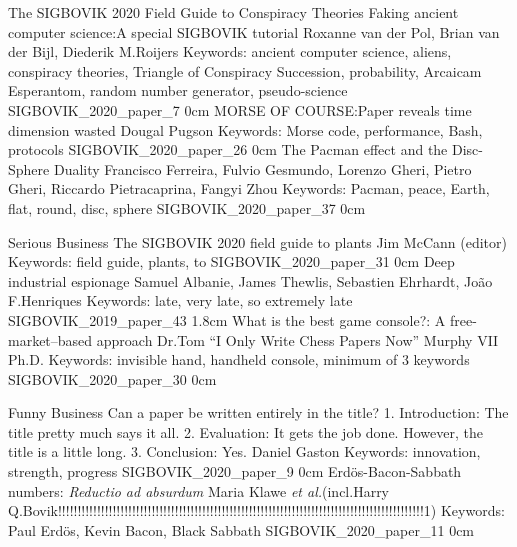 \addtrack
	{}{The SIGBOVIK 2020 Field Guide to Conspiracy Theories}
\addpaper
	{Faking ancient computer science:\@ A special SIGBOVIK tutorial}
	{Roxanne van der Pol, Brian van der Bijl, Diederik M.\@ Roijers}
	{Keywords: ancient computer science, aliens, conspiracy theories, Triangle of Conspiracy Succession, probability, Arcaicam Esperantom, random number generator, pseudo-science}
	{SIGBOVIK_2020_paper_7}
	{0cm}
	{}
\addpaper
	{MORSE OF COURSE:\@ Paper reveals time dimension wasted}
	{Dougal Pugson}
	{Keywords: Morse code, performance, Bash, protocols}
	{SIGBOVIK_2020_paper_26}
	{0cm}
	{}
\addpaper
	{The Pacman effect and the Disc-Sphere Duality}
	{Francisco Ferreira, Fulvio Gesmundo, Lorenzo Gheri, Pietro Gheri, Riccardo Pietracaprina, Fangyi Zhou}
	{Keywords: Pacman, peace, Earth, flat, round, disc, sphere}
	{SIGBOVIK_2020_paper_37}
	{0cm}
	{}

\addtrack
	{}{Serious Business}
\addpaper
	{The SIGBOVIK 2020 field guide to plants}
	{Jim McCann (editor)}
	{Keywords: field guide, plants, to}
	{SIGBOVIK_2020_paper_31}
	{0cm}
	{}
\addpaper
	{Deep industrial espionage}
	{Samuel Albanie, James Thewlis, Sebastien Ehrhardt, Jo\~ao F.\@ Henriques}
	{Keywords: late, very late, so extremely late}
	{SIGBOVIK_2019_paper_43}
	{1.8cm}
	{}
\addpaper
	{What is the best game console?: A free-market--based approach}
	{Dr.\@ Tom ``I Only Write Chess Papers Now'' Murphy VII Ph.D.}
	{Keywords: invisible hand, handheld console, minimum of 3 keywords}
	{SIGBOVIK_2020_paper_30}
	{0cm}
	{}

\addtrack
	{}{Funny Business}
\addpaper
	{Can a paper be written entirely in the title? 1. Introduction: The title pretty much says it all. 2. Evaluation: It gets the job done. However, the title is a little long. 3. Conclusion: Yes.}
	{Daniel Gaston}
	{Keywords: innovation, strength, progress}
	{SIGBOVIK_2020_paper_9}
	{0cm}
	{}
\addpaper
	{Erd\"os-Bacon-Sabbath numbers: \textit{Reductio ad absurdum}}
	{Maria Klawe \textit{et al.}\@ (incl.\@ Harry Q.\@ Bovik!!!!!!!!!!!!!!!!!!!!!!!!!!!!!!!!!!!!!!!!!!!!!!!!!!!!!!!!!!!!!!!!!!!!!!!!!!!!!!!!!!!!!!!!!!!!!!1)}
	{Keywords: Paul Erd\"os, Kevin Bacon, Black Sabbath}
	{SIGBOVIK_2020_paper_11}
	{0cm}
	{}
